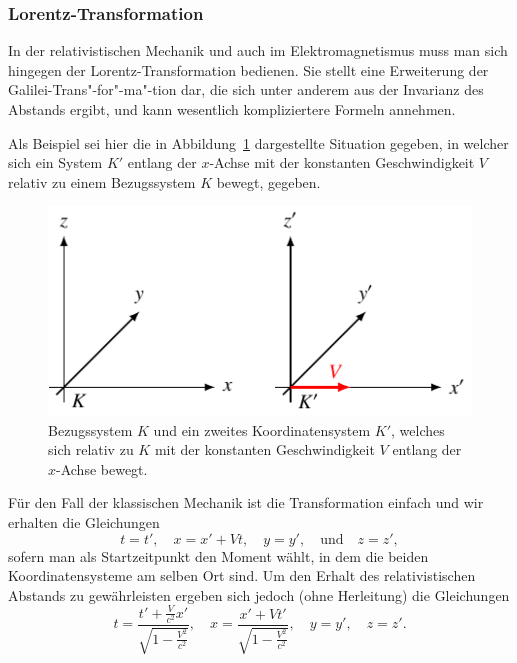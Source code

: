 \subsubsection{Lorentz-Transformation 
\label{relativ:section:lorentz-trafo}}

In der relativistischen Mechanik und auch im Elektromagnetismus
muss man sich hingegen der Lorentz-Transformation bedienen.
Sie stellt eine Erweiterung der Galilei-Trans"-for"-ma"-tion dar,
die sich unter anderem aus der Invarianz des Abstands ergibt,
und kann wesentlich kompliziertere Formeln annehmen.

Als Beispiel sei hier die in Abbildung~\ref{relativ:fig:lorentz-trafo-koords}
dargestellte Situation gegeben, in welcher sich ein System \(K'\)
entlang der \(x\)-Achse mit der konstanten Geschwindigkeit \(V\)
relativ zu einem Bezugssystem \(K\) bewegt, gegeben.
\begin{figure}
    \centering
    \includegraphics{papers/relativ/tikz/lorentz-trafo-koord.pdf}
    \caption{Bezugssystem \(K\) und ein zweites Koordinatensystem \(K'\),
    welches sich relativ zu \(K\) mit der konstanten Geschwindigkeit \(V\)
    entlang der \(x\)-Achse bewegt.
    \label{relativ:fig:lorentz-trafo-koords}}
\end{figure}
Für den Fall der klassischen Mechanik ist die Transformation einfach und
wir erhalten die Gleichungen
\begin{equation}
    t = t', \quad
    x = x' + Vt, \quad
    y = y', \quad \text{und} \quad
    z = z',
    \label{relativ:eqn:galilei-trafo-beisp}
\end{equation}
sofern man als Startzeitpunkt den Moment wählt,
in dem die beiden Koordinatensysteme am selben Ort sind.
Um den Erhalt des relativistischen Abstands zu gewährleisten
ergeben sich jedoch (ohne Herleitung) die Gleichungen
\begin{equation}
    t = \frac{t' + \frac{V}{c^2}x'}{\sqrt{1-\frac{V^2}{c^2}}}, \quad
    x = \frac{x' + V t'}{\sqrt{1 - \frac{V^2}{c^2}}}, \quad
    y = y', \quad
    z = z'.
    \label{relativ:eqn:lorentz-trafo-beisp}
\end{equation}
